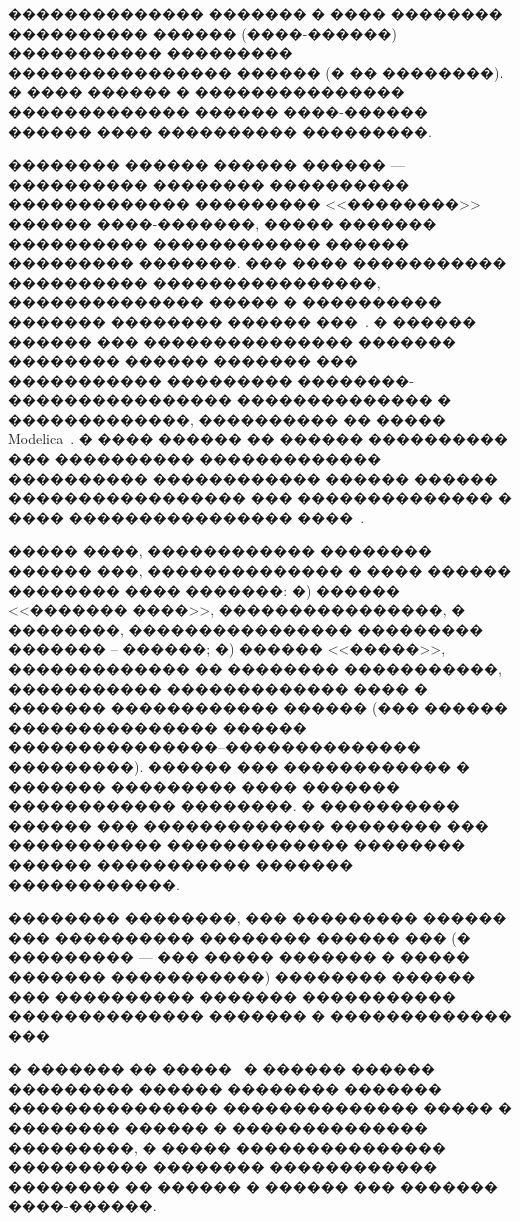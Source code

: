 \documentclass[12pt,a4paper]{article}
\begin{document}
�������������� ������� � ���� �������� ���������� ������ (����-������) 
����������� ��������� ���������������� ������ (� �� ��������). � ���� ������ �
��������������� ������������� ������ ����-������ ������ ���� ���������� 
���������.

�������� ������ ������ ������ --- ���������� �������� ���������� ������������� 
��������� <<��������>> ������ ����-�������, ����� ������� ���������� 
������������ ������ ��������� �������. ��� ���� ����������� ���������� 
����������������, �������������� ����� � ���������� ������� �������� ������ 
���~\cite{Kosenko2007}. � ������ ������ ��� ��������������� ������� ��������
������ ������� ��� ����������� ��������� ��������-���������������� 
�������������� � �������������, ���������� �� ����� 
Modelica~\cite{KosenkoKuznetzova}. � ���� ������ �� ������ ���������� ��� 
���������� ������������� ���������� ������������ ������ ������ 
����������������� ��� �������������� � ���� ���������������� 
����~\cite{Kosenko2007}.

����� ����, ������������ �������� ������ ���, �������������� � ���� ������ 
�������� ���� �������: �) ������ <<������� ����>>, ����������������, � 
��������, ���������������� ��������� ������� -- ������; �) ������ <<�����>>,
������������� �� �������� �����������, ����������� ������������� ���� � �������
������������ ������ (��� ������ ��������������� ������ 
���������������--�������������� ���������). ������ ��� ������������ � ������� 
��������� ���� ������� ������������ ��������. � ���������� ������ ��� 
������������� �������� ��� ����������� ������������� �������� ������ 
����������� ������� ������������.

�������� ��������, ��� ��������� ������ ��� ���������� �������� ������ ��� (�
��������� --- ��� ����� ������� � ����� ������� �����������) �������� ������ 
��� ���������� ������� ����������� �������������� ������� � ������������� 
���~\cite{KosenkoAlexandrov,KosenkoGusev}

� ������� �� �����~\cite{Kalman,Tobolar} � ������ ������ ��������� ������ 
�������� ������� ��������������� �������������� ����� � �������� ������ � 
�������������� ���������, � ����� ��������������� ���������� �������� 
������������ �������� �� ������ � ������ ��� ������� ����-������.
\end{document}
